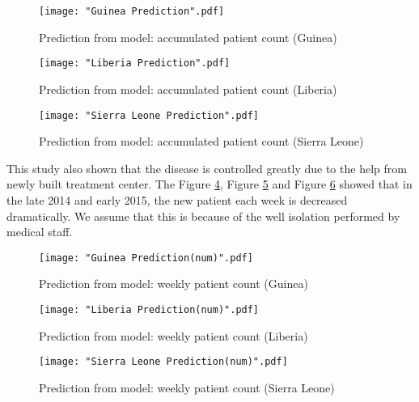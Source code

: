 \documentclass[11pt]{article}
\begin{document}
\begin{figure}[htbp]
\centerline{\texttt{[image: "Guinea Prediction".pdf]}}
\caption{Prediction from model: accumulated patient count (Guinea)}
\label{GuineaPrediction}
\end{figure}

\begin{figure}[htbp]
\centerline{\texttt{[image: "Liberia Prediction".pdf]}}
\caption{Prediction from model: accumulated patient count (Liberia)}
\label{LiberiaPrediction}
\end{figure}

\begin{figure}[htbp]
\centerline{\texttt{[image: "Sierra Leone Prediction".pdf]}}
\caption{Prediction from model: accumulated patient count (Sierra Leone)}
\label{SierraLeonePrediction}
\end{figure}


This study also shown that the disease is controlled greatly due to the help from newly built treatment center. The Figure \ref{GuineaPrediction2}, Figure \ref{LiberiaPrediction2} and Figure \ref{SierraLeonePrediction2} showed that in the late 2014 and early 2015, the new patient each week is decreased dramatically. We assume that this is because of the well isolation performed by medical staff.

\begin{figure}[htbp]
\centerline{\texttt{[image: "Guinea Prediction(num)".pdf]}}
\caption{Prediction from model: weekly patient count (Guinea)}
\label{GuineaPrediction2}
\end{figure}

\begin{figure}[htbp]
\centerline{\texttt{[image: "Liberia Prediction(num)".pdf]}}
\caption{Prediction from model: weekly patient count (Liberia)}
\label{LiberiaPrediction2}
\end{figure}

\begin{figure}[htbp]
\centerline{\texttt{[image: "Sierra Leone Prediction(num)".pdf]}}
\caption{Prediction from model: weekly patient count (Sierra Leone)}
\label{SierraLeonePrediction2}
\end{figure}

\end{document}
